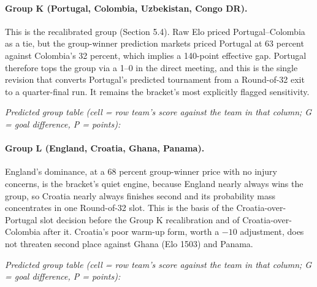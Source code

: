 \documentclass[11pt,letterpaper]{article}
\begin{document}
\paragraph{Group K (Portugal, Colombia, Uzbekistan, Congo DR).} This is the recalibrated group (Section 5.4). Raw Elo priced Portugal--Colombia as a tie, but the group-winner prediction markets priced Portugal at 63 percent against Colombia's 32 percent, which implies a 140-point effective gap. Portugal therefore tops the group via a 1--0 in the direct meeting, and this is the single revision that converts Portugal's predicted tournament from a Round-of-32 exit to a quarter-final run. It remains the bracket's most explicitly flagged sensitivity.

\noindent\textit{\footnotesize Predicted group table (cell = row team's score against the team in that column; G = goal difference, P = points):}



\paragraph{Group L (England, Croatia, Ghana, Panama).} England's dominance, at a 68 percent group-winner price with no injury concerns, is the bracket's quiet engine, because England nearly always wins the group, so Croatia nearly always finishes second and its probability mass concentrates in one Round-of-32 slot. This is the basis of the Croatia-over-Portugal slot decision before the Group K recalibration and of Croatia-over-Colombia after it. Croatia's poor warm-up form, worth a $-10$ adjustment, does not threaten second place against Ghana (Elo 1503) and Panama.

\noindent\textit{\footnotesize Predicted group table (cell = row team's score against the team in that column; G = goal difference, P = points):}
\end{document}
